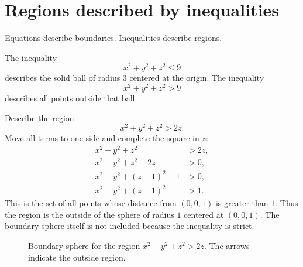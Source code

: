 \section{Regions described by inequalities}

Equations describe boundaries. Inequalities describe regions.

The inequality
\[
  x^2+y^2+z^2\le 9
\]
describes the solid ball of radius $3$ centered at the origin. The inequality
\[
  x^2+y^2+z^2>9
\]
describes all points outside that ball.

\begin{examplebox}[title={Worked example: completing the square}]
Describe the region
\[
  x^2+y^2+z^2>2z.
\]
Move all terms to one side and complete the square in $z$:
\[
\begin{aligned}
x^2+y^2+z^2&>2z,\\
x^2+y^2+z^2-2z&>0,\\
x^2+y^2+(z-1)^2-1&>0,\\
x^2+y^2+(z-1)^2&>1.
\end{aligned}
\]
This is the set of all points whose distance from $(0,0,1)$ is greater than $1$. Thus the region is the outside of the sphere of radius $1$ centered at $(0,0,1)$. The boundary sphere itself is not included because the inequality is strict.
\end{examplebox}

\begin{figure}[H]
\centering
{}
\caption{Boundary sphere for the region $x^2+y^2+z^2>2z$. The arrows indicate the outside region.}
\label{fig:outside-sphere-region}
\end{figure}

